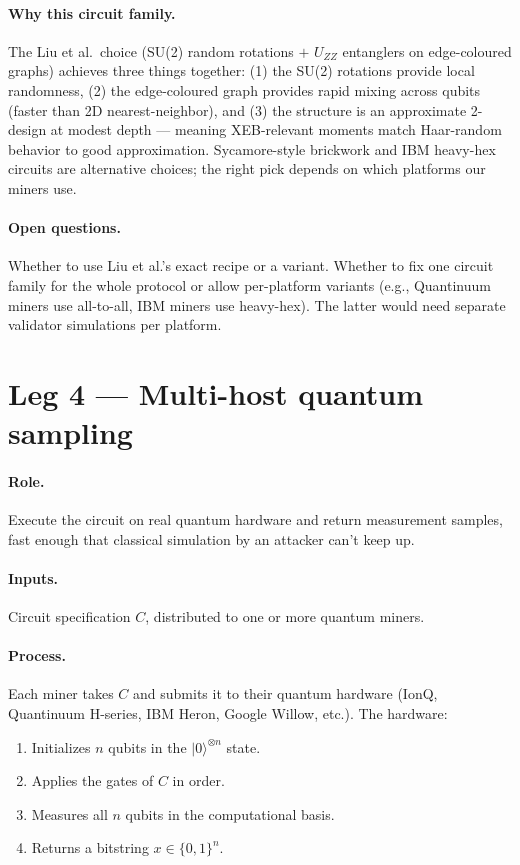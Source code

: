 \documentclass[11pt]{article}
\begin{document}
\paragraph{Why this circuit family.} The Liu et al.\ choice (SU(2) random rotations $+$ $U_{ZZ}$ entanglers on edge-coloured graphs) achieves three things together: (1) the SU(2) rotations provide local randomness, (2) the edge-coloured graph provides rapid mixing across qubits (faster than 2D nearest-neighbor), and (3) the structure is an approximate 2-design at modest depth --- meaning XEB-relevant moments match Haar-random behavior to good approximation. Sycamore-style brickwork and IBM heavy-hex circuits are alternative choices; the right pick depends on which platforms our miners use.

\paragraph{Open questions.} Whether to use Liu et al.'s exact recipe or a variant. Whether to fix one circuit family for the whole protocol or allow per-platform variants (e.g., Quantinuum miners use all-to-all, IBM miners use heavy-hex). The latter would need separate validator simulations per platform.

\section{Leg 4 --- Multi-host quantum sampling}

\paragraph{Role.} Execute the circuit on real quantum hardware and return measurement samples, fast enough that classical simulation by an attacker can't keep up.

\paragraph{Inputs.} Circuit specification $C$, distributed to one or more quantum miners.

\paragraph{Process.} Each miner takes $C$ and submits it to their quantum hardware (IonQ, Quantinuum H-series, IBM Heron, Google Willow, etc.). The hardware:

\begin{enumerate}
    \item Initializes $n$ qubits in the $|0\rangle^{\otimes n}$ state.
    \item Applies the gates of $C$ in order.
    \item Measures all $n$ qubits in the computational basis.
    \item Returns a bitstring $x \in \{0,1\}^n$.
\end{enumerate}
\end{document}
